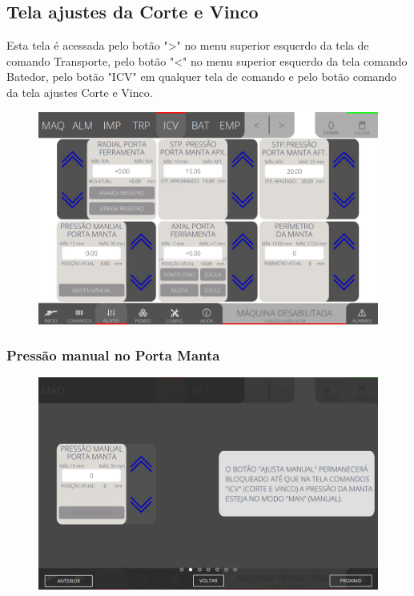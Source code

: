 \thispagestyle{fancy}
\vspace*{40 pt}
\subsection{Tela ajustes da Corte e Vinco} \label{sec:telaAjustesCorteEVinco}
Esta tela é acessada pelo botão "\textgreater" no menu superior esquerdo da tela de comando Transporte, pelo botão "\textless{}" no menu superior esquerdo da tela comando Batedor, pelo botão "ICV" em qualquer tela de comando e pelo botão comando da tela ajustes Corte e Vinco.
\vspace*{\fill}
\begin{figure}[h]
    \centering
    \includegraphics[width=480 px,height=300 px]{src/imagesICV/06-dryCutter/settings/e-Tela-Principal.png}
\end{figure}
\vspace*{\fill}

\newpage
\thispagestyle{fancy}
\vspace*{40 pt}
\subsubsection{\small{Pressão manual no Porta Manta}} \label{sec:telaAjustesCorteEVincoPressaoManualPortaManta}
\vspace*{\fill}
\begin{figure}[h]
    \centering
    \includegraphics[width=576 px,height=360 px]{src/imagesICV/06-dryCutter/settings/e-2.png}
\end{figure}
\vspace*{\fill}

